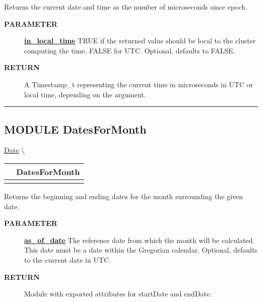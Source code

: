 \par
Returns the current date and time as the number of microseconds since epoch.

\par
\begin{description}
\item [\colorbox{tagtype}{\color{white} \textbf{\textsf{PARAMETER}}}] \textbf{\underline{in\_local\_time}} TRUE if the returned value should be local to the cluster computing the time, FALSE for UTC. Optional, defaults to FALSE.
\item [\colorbox{tagtype}{\color{white} \textbf{\textsf{RETURN}}}] \textbf{\underline{}} A Timestamp\_t representing the current time in microseconds in UTC or local time, depending on the argument.
\end{description}

\rule{\linewidth}{0.5pt}
\subsection*{\textsf{\colorbox{headtoc}{\color{white} MODULE}
DatesForMonth}}

\hypertarget{ecldoc:date.datesformonth}{}
\hspace{0pt} \hyperlink{ecldoc:Date}{Date} \textbackslash 

{\renewcommand{\arraystretch}{1.5}
\begin{tabularx}{\textwidth}{|>{\raggedright\arraybackslash}l|X|}
\hline
\hspace{0pt}\mytexttt{\color{red} } & \textbf{DatesForMonth} \\
\hline
\multicolumn{2}{|>{\raggedright\arraybackslash}X|}{\hspace{0pt}\mytexttt{\color{param} (Date\_t as\_of\_date = CurrentDate(FALSE))}} \\
\hline
\end{tabularx}
}

\par
Returns the beginning and ending dates for the month surrounding the given date.

\par
\begin{description}
\item [\colorbox{tagtype}{\color{white} \textbf{\textsf{PARAMETER}}}] \textbf{\underline{as\_of\_date}} The reference date from which the month will be calculated. This date must be a date within the Gregorian calendar. Optional, defaults to the current date in UTC.
\item [\colorbox{tagtype}{\color{white} \textbf{\textsf{RETURN}}}] \textbf{\underline{}} Module with exported attributes for startDate and endDate.
\end{description}


